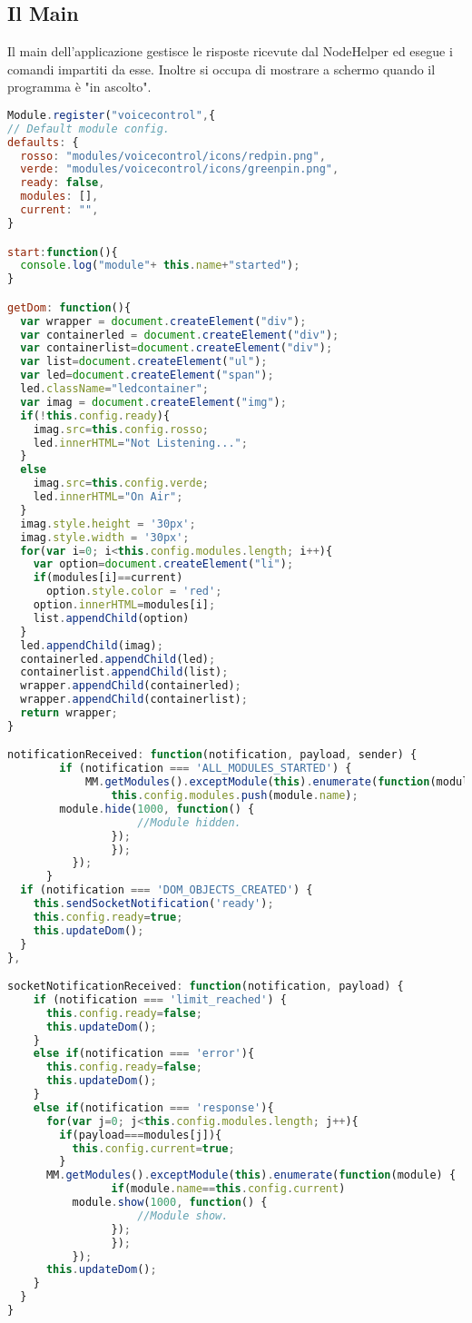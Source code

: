 \subsection{Il Main}
Il main dell'applicazione gestisce le risposte ricevute dal NodeHelper ed esegue i comandi
impartiti da esse.
Inoltre si occupa di mostrare a schermo quando il programma è "in ascolto".
\begin{lstlisting}[language=Javascript]
Module.register("voicecontrol",{
// Default module config.
defaults: {
  rosso: "modules/voicecontrol/icons/redpin.png",
  verde: "modules/voicecontrol/icons/greenpin.png",
  ready: false,
  modules: [],
  current: "",
}

start:function(){
  console.log("module"+ this.name+"started");
}

getDom: function(){
  var wrapper = document.createElement("div");
  var containerled = document.createElement("div");
  var containerlist=document.createElement("div");
  var list=document.createElement("ul");
  var led=document.createElement("span");
  led.className="ledcontainer";
  var imag = document.createElement("img");
  if(!this.config.ready){
    imag.src=this.config.rosso;
    led.innerHTML="Not Listening...";
  }
  else
    imag.src=this.config.verde;
    led.innerHTML="On Air";
  }
  imag.style.height = '30px';
  imag.style.width = '30px';
  for(var i=0; i<this.config.modules.length; i++){
    var option=document.createElement("li");
    if(modules[i]==current)
      option.style.color = 'red';
    option.innerHTML=modules[i];
    list.appendChild(option)
  }
  led.appendChild(imag);
  containerled.appendChild(led);
  containerlist.appendChild(list);
  wrapper.appendChild(containerled);
  wrapper.appendChild(containerlist);
  return wrapper;
}

notificationReceived: function(notification, payload, sender) {
		if (notification === 'ALL_MODULES_STARTED') {
			MM.getModules().exceptModule(this).enumerate(function(module) {
				this.config.modules.push(module.name);
        module.hide(1000, function() {
					//Module hidden.
				});
				});
		  });
	  }
  if (notification === 'DOM_OBJECTS_CREATED') {
    this.sendSocketNotification('ready');
    this.config.ready=true;
    this.updateDom();
  }
},

socketNotificationReceived: function(notification, payload) {
    if (notification === 'limit_reached') {
      this.config.ready=false;
      this.updateDom();
    }
    else if(notification === 'error'){
      this.config.ready=false;
      this.updateDom();
    }
    else if(notification === 'response'){
      for(var j=0; j<this.config.modules.length; j++){
        if(payload===modules[j]){
          this.config.current=true;
        }
      MM.getModules().exceptModule(this).enumerate(function(module) {
				if(module.name==this.config.current)
          module.show(1000, function() {
  					//Module show.
  				});
				});
		  });
      this.updateDom();
    }
  }
}
\end{lstlisting}
